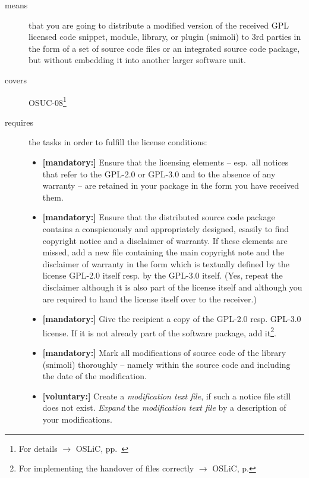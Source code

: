 \begin{description}
\item[means] that you are going to distribute a modified version of the received
GPL licensed code snippet, module, library, or plugin (snimoli) to 3rd
parties in the form of a set of source code files or an integrated source code
package, but without embedding it into another larger software unit.
\item[covers] OSUC-08\footnote{For details $\rightarrow$ OSLiC, pp.\ \pageref{OSUC-08-DEF}}
\item[requires] the tasks in order to fulfill the license conditions:
\begin{itemize}
 
  \item \textbf{[mandatory:]} Ensure that the licensing elements -- esp.\ all
  notices that refer to the GPL-2.0 or GPL-3.0 and to the absence of any
  warranty -- are retained in your package in the form you have received them.

  \item \textbf{[mandatory:]} Ensure that the distributed source code package
  contains a conspicuously and appropriately designed, esasily to find copyright
  notice and a disclaimer of warranty. If these elements are missed, add a new
  file containing the main copyright note and the disclaimer of warranty in the
  form which is textually defined by the license GPL-2.0 itself resp. by the
  GPL-3.0 itself. (Yes, repeat the disclaimer although it is also part of the
  license itself and although you are required to hand the license itself over
  to the receiver.)
  
  \item \textbf{[mandatory:]} Give the recipient a copy of the GPL-2.0 resp.
  GPL-3.0 license. If it is not already part of the software package, add
  it\footnote{For implementing the handover of files correctly $\rightarrow$
  OSLiC, p. \pageref{DistributingFilesHint}}.
  
  \item \textbf{[mandatory:]} Mark all modifications of source code of the
  library (snimoli) thoroughly -- namely within the source code and including
  the date of the modification.
    
  \item \textbf{[voluntary:]} Create a \emph{modification text file}, if such a
  notice file still does not exist. \emph{Expand} the \emph{modification text
  file} by a description of your modifications.
  

\end{itemize}
\end{description}
